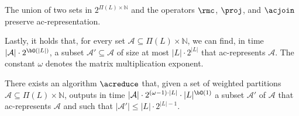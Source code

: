\begin{toappendix}
\begin{lemma}\label{lemma:acyclic:cw:framework:ac_preserve}
    The union of two sets in $2^{\Pi(L) \times \mathbb{N}}$ and the operators
    $\rmc$, $\proj$, and $\acjoin$ preserve ac-representation.
\end{lemma}


Lastly, it holds that, for every set $\mathcal{A} \subseteq \Pi(L) \times \mathbb{N}$, we can find,
in time $|\mathcal{A}| \cdot 2^{\bO(|L|)}$, a subset $\mathcal{A}' \subseteq \mathcal{A}$ of size at
most $|L| \cdot 2^{|L|}$ that ac-represents $\mathcal{A}$.
The constant $\omega$ denotes the matrix multiplication exponent.

\begin{theorem}\label{thm:reduce1}
    There exists an algorithm $\acreduce$ that,
    given a set of weighted partitions $\mathcal{A} \subseteq \Pi(L) \times \mathbb{N}$,
    outputs in time $|\mathcal{A}| \cdot 2^{(\omega-1) \cdot |L|} \cdot |L|^{\bO(1)}$
    a subset $\mathcal{A}'$ of $\mathcal{A}$ that ac-represents $\mathcal{A}$ and
    such that $|\mathcal{A}'| \leq |L| \cdot 2^{|L|-1}$.
\end{theorem}

\end{toappendix}
